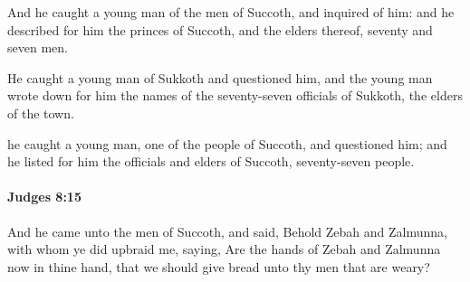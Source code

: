 			\begin{versebox}
					\item[BHS] 
					\item[ASV] And he caught a young man of the men of Succoth, and inquired of him: and he described for him the princes of Succoth, and the elders thereof, seventy and seven men.
					\item[NIV] He caught a young man of Sukkoth and questioned him, and the young man wrote down for him the names of the seventy-seven officials of Sukkoth, the elders of the town.
					\item[NRSV] he caught a young man, one of the people of Succoth, and questioned him; and he listed for him the officials and elders of Succoth, seventy-seven people.
			\end{versebox}

		\paragraph{Judges 8:15} %
			\label{JUDGES-8-15}

			And he came unto the men of Succoth, and said, Behold Zebah and Zalmunna, with whom ye did upbraid me, saying, Are the hands of Zebah and Zalmunna now in thine hand, that we should give bread unto thy men that are weary?

